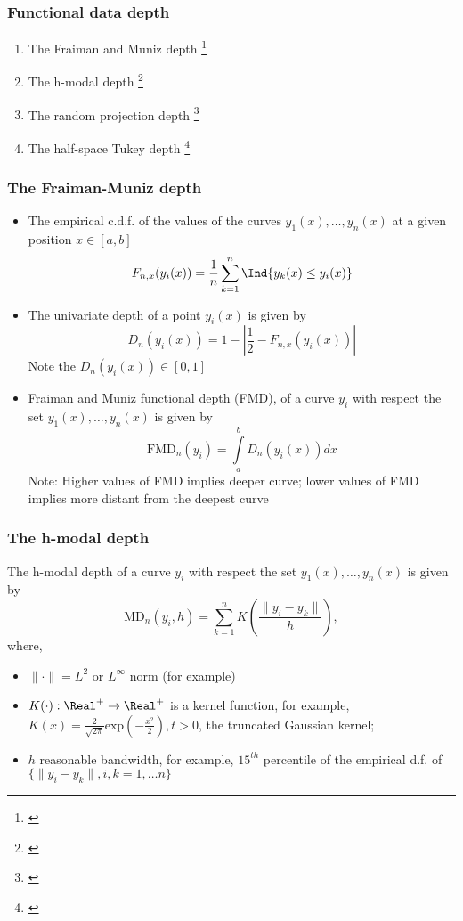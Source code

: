 \documentclass[10pt,dvipsnames,table]{beamer}
\begin{document}
\begin{frame}
\frametitle{Functional data depth}
\LARGE
\begin{enumerate}
\item The Fraiman and Muniz depth \footnote{\cite{Fraiman_Muniz_2001_SEIO}}
\vspace{0.25in}
\item The h-modal depth \footnote{\cite{Febrero-Bande_etal_2007_Environmetrics}}
\vspace{0.25in}
\item The random projection depth \footnote{\cite{Febrero-Bande_etal_2007_Environmetrics}}
\vspace{0.25in}
\item The half-space Tukey depth \footnote{\cite{Cuesta-Albertos_Nieto-Reyes_2008_CSDA}}
\end{enumerate}
\end{frame}

\begin{frame}
\frametitle{The Fraiman-Muniz depth}
\small
\begin{itemize}
\item The empirical c.d.f. of the values of the curves $y_1(x), \dots , y_n(x)$ at a given position $x \in [a, b]$
\[ F_{n,x} (y_i (x)) = \frac{1}{n}\sum\limits_{k=1}^{n} \Ind\{ y_k(x) \leq y_i(x)\}\]
\pause
\item The univariate depth of a point $y_i(x)$ is given by
\[ D_n(y_i(x)) = 1 - \left| \frac{1}{2} - F_{n,x} (y_i (x)) \right| \]
Note the $D_n(y_i(x)) \in [0, 1]$
\pause
\item Fraiman and Muniz functional depth (FMD), of a curve $y_i$ with respect the set $y_1(x), \dots , y_n(x)$ is given by 
\[ \text{FMD}_n(y_i) = \int\limits_a^b D_n(y_i(x)) dx \]
Note: Higher values of FMD implies deeper curve; lower values of FMD implies more distant from the deepest curve
\end{itemize}
\end{frame}

\begin{frame}
\frametitle{The h-modal depth}
The h-modal depth of a curve $y_i$ with respect the set $y_1(x), \dots , y_n(x)$ is given by
\[ \text{MD}_n(y_i, h) = \sum\limits_{k = 1}^n K\left( \frac{\|y_i - y_k \|}{h} \right),\]
where, \begin{itemize}
\item $\|\cdot\| = L^2 \text{ or } L^{\infty}$ norm (for example)
\item $K(\cdot): \Real^{+} \rightarrow \Real^{+}$ is a kernel function, for example, $K(x) = \frac{2}{\sqrt{2\pi}} \text{exp}\left(-\frac{x^2}{2}\right), t > 0$, the truncated Gaussian kernel;
\item $h$ reasonable bandwidth, for example, $15^{th}$ percentile of the empirical d.f. of $\{ \|y_i - y_k \|, i, k = 1, \dots n \}$
\end{itemize}
\end{frame}
\end{document}
